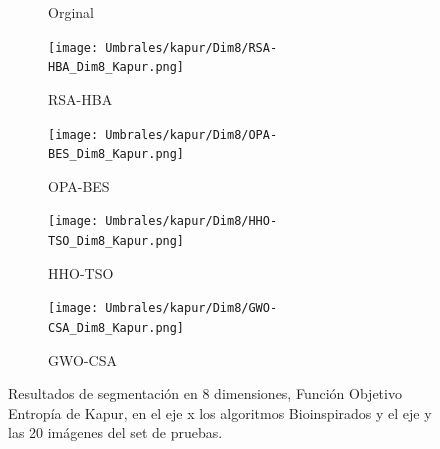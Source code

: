\documentclass[conference]{IEEEtran}
\begin{document}
\begin{figure}[!htb]
\begin{subfigure}[b]{0.13\textwidth}
		\caption{Orginal}
		\label{fig:imgOrginal}
	\end{subfigure}
	\begin{subfigure}[b]{0.13\textwidth}
		\texttt{[image: Umbrales/kapur/Dim8/RSA-HBA\_Dim8\_Kapur.png]}
		\caption{RSA-HBA}
		\label{fig:imagen1}
	\end{subfigure}
	\begin{subfigure}[b]{0.13\textwidth}
		\texttt{[image: Umbrales/kapur/Dim8/OPA-BES\_Dim8\_Kapur.png]}
		\caption{OPA-BES}
		\label{fig:imagen2}
	\end{subfigure}
	\begin{subfigure}[b]{0.13\textwidth}
		\texttt{[image: Umbrales/kapur/Dim8/HHO-TSO\_Dim8\_Kapur.png]}
		\caption{HHO-TSO}
		\label{fig:imagen2}
	\end{subfigure}
	\begin{subfigure}[b]{0.13\textwidth}
		\texttt{[image: Umbrales/kapur/Dim8/GWO-CSA\_Dim8\_Kapur.png]}
		\caption{GWO-CSA}
		\label{fig:imagen2}
	\end{subfigure}
	
	
	\caption{Resultados de segmentación en 8 dimensiones, Función Objetivo Entropía de Kapur, en el eje x los algoritmos Bioinspirados y el eje y las 20 imágenes del set de pruebas.}
	\label{fig:resultados7dim}
\end{figure}
\end{document}
